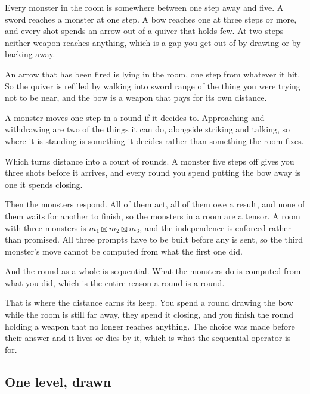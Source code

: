 \documentclass[11pt,a4paper]{article}
\begin{document}
Every monster in the room is somewhere between one step away and five. A sword reaches a monster
at one step. A bow reaches one at three steps or more, and every shot spends an arrow out of a
quiver that holds few. At two steps neither weapon reaches anything, which is a gap you get out
of by drawing or by backing away.

An arrow that has been fired is lying in the room, one step from whatever it hit. So the quiver
is refilled by walking into sword range of the thing you were trying not to be near, and the
bow is a weapon that pays for its own distance.

A monster moves one step in a round if it decides to. Approaching and withdrawing are two of the
things it can do, alongside striking and talking, so where it is standing is something it decides
rather than something the room fixes.

\begin{sectionbox}
Which turns distance into a count of rounds. A monster five steps off gives you three shots
before it arrives, and every round you spend putting the bow away is one it spends closing.
\end{sectionbox}

Then the monsters respond. All of them act, all of them owe a result, and none of them waits for
another to finish, so the monsters in a room are a tensor. A room with three monsters is
$m_1 \boxtimes m_2 \boxtimes m_3$, and the independence is enforced rather than promised. All
three prompts have to be built before any is sent, so the third monster's move cannot be computed from
what the first one did.

And the round as a whole is sequential. What the monsters do is computed from what you did, which
is the entire reason a round is a round.

That is where the distance earns its keep. You spend a round drawing the bow while the room is
still far away, they spend it closing, and you finish the round holding a weapon that no longer
reaches anything. The choice was made before their answer and it lives or dies by it, which is
what the sequential operator is for.

\subsection{One level, drawn}
\end{document}
